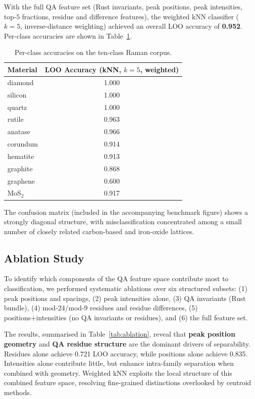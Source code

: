 \documentclass[12pt]{article}
\begin{document}
With the full QA feature set (Rust invariants, peak positions, peak intensities,
top-$5$ fractions, residue and difference features), the weighted kNN classifier
($k=5$, inverse-distance weighting) achieved an overall LOO accuracy of
\textbf{0.952}.
Per-class accuracies are shown in Table~\ref{tab:perclass}.

\begin{table}[h]
\centering
\begin{tabular}{l c}
\hline
Material & LOO Accuracy (kNN, $k=5$, weighted) \\
\hline
diamond & 1.000 \\
silicon & 1.000 \\
quartz & 1.000 \\
rutile & 0.963 \\
anatase & 0.966 \\
corundum & 0.914 \\
hematite & 0.913 \\
graphite & 0.868 \\
graphene & 0.600 \\
MoS$_2$ & 0.917 \\
\hline
\end{tabular}
\caption{Per-class accuracies on the ten-class Raman corpus.}
\label{tab:perclass}
\end{table}

The confusion matrix (included in the accompanying benchmark figure)
shows a strongly diagonal structure, with misclassification concentrated
among a small number of closely related carbon-based and iron-oxide lattices.

\subsection{Ablation Study}

To identify which components of the QA feature space contribute most to classification,
we performed systematic ablations over six structured subsets:
(1) peak positions and spacings,
(2) peak intensities alone,
(3) QA invariants (Rust bundle),
(4) mod-24/mod-9 residues and residue differences,
(5) positions+intensities (no QA invariants or residues),
and (6) the full feature set.

The results, summarised in Table~\ref{tab:ablation}, reveal that
\textbf{peak position geometry} and \textbf{QA residue structure} are the dominant drivers of separability.
Residues alone achieve 0.721 LOO accuracy, while positions alone achieve 0.835.
Intensities alone contribute little, but enhance intra-family separation when
combined with geometry. Weighted kNN exploits the local structure of
this combined feature space, resolving fine-grained distinctions overlooked by centroid methods.
\end{document}
